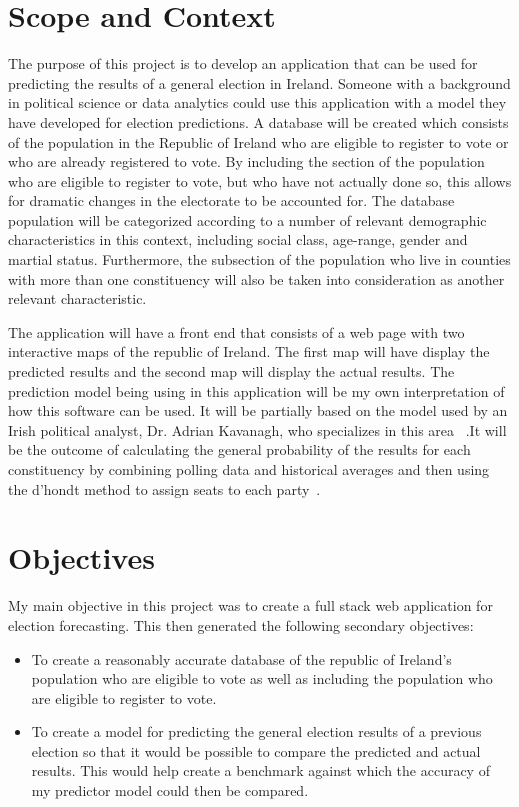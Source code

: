 \section{Scope and Context}
The purpose of this project is to develop an application that can be used for predicting the results of a general election in Ireland. Someone with a background in political science or data analytics could use this application with a model they have developed for election predictions. A database will be created which consists of the population in the Republic of Ireland who are eligible to register to vote or who are already registered to vote. By including the section of the population who are eligible to register to vote, but who have not actually done so, this allows for dramatic changes in the electorate to be accounted for. The database population will be categorized according to a number of relevant demographic characteristics in this context, including  social class, age-range, gender and martial status. Furthermore, the subsection of the population who live in counties with more than one constituency will also be taken into consideration as another relevant characteristic. 

The application will have a front end that consists of a web page with two interactive maps of the republic of Ireland. The first map will have display the predicted results and the second map will display the actual results. The prediction model being using in this application will be my own interpretation of how this software can be used.  It will be partially based on the model used by an Irish political analyst, Dr. Adrian Kavanagh, who specializes in this area ~\cite{adrian}.It will be the outcome of calculating the general probability of the results for each constituency by combining polling data and historical averages and then using the d’hondt method to assign seats to each party~\cite{adrian}.

\section{Objectives}
My main objective in this project was to create a full stack web application for election forecasting. This then generated the following secondary objectives:
\begin{itemize}
	\item To create a reasonably accurate database of the republic of Ireland's population who are eligible to vote as well as including the population who are eligible to register to vote.
	\item To create a model for predicting the general election results of a previous election so that it would be possible to compare the predicted and actual results. This would help create a benchmark against which the accuracy of my predictor model could then be compared.
\end{itemize}


